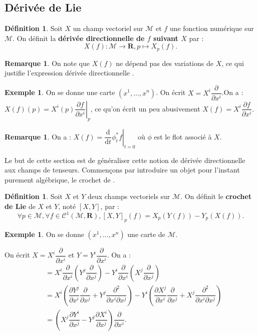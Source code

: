 \documentclass[12pt,a4paper]{article}
\theoremstyle{definition}
\newtheorem{defn}[thm]{Définition}
\newtheorem{ex}[thm]{Exemple}
\newtheorem{rqe}[thm]{Remarque}
\begin{document}
\subsection{Dérivée de Lie}
\begin{defn}
Soit $X$ un champ vectoriel sur $\mathcal{M}$ et $f$ une fonction numérique sur $\mathcal{M}$. On définit la \textbf{dérivée directionnelle de $f$ suivant $X$} par :
$$X(f):\mathcal{M}\to\mathbf{R}, p\mapsto X_p(f).$$
\end{defn}
\begin{rqe}
On note que $X(f)$ ne dépend pas des variations de $X$, ce qui justifie l'expression \og dérivée directionnelle \fg{} .
\end{rqe}
\begin{ex}
On se donne une carte $(x^1,\ldots,x^n)$. On écrit $X=X^i\dfrac{\partial}{\partial x^i}$.\newline On a : $X(f)(p)=X^i(p)\left.\dfrac{\partial f}{\partial x^i}\right|_p$, ce qu'on écrit un peu abusivement $X(f)=X^i\dfrac{\partial f}{\partial x^i}$.
\end{ex}
\begin{rqe}
On a : $X(f)=\left.\dfrac{\mathrm{d}}{\mathrm{d}t}\phi_t^*f\right|_{t=0}$ où $\phi$ est le flot associé à $X$.
\end{rqe}
Le but de cette section est de généraliser cette notion de dérivée directionnelle aux champs de tenseurs.
Commençons par introduire un objet pour l'instant purement algébrique, le crochet de .
\begin{defn}
Soit $X$ et $Y$ deux champs vectoriels sur $\mathcal{M}$.\newline
On définit le \textbf{crochet de Lie} de $X$ et $Y$, noté $[X,Y]$, par :
$$\forall p\in\mathcal{M},\forall f\in\mathcal{C}^1(\mathcal{M},\mathbf{R}), [X,Y]_p(f)=X_p(Y(f))-Y_p(X(f)).$$
\end{defn}
\begin{ex}
On se donne $(x^1,\ldots,x^n)$ une carte de $\mathcal{M}$.

On écrit $X=X^i\dfrac{\partial}{\partial x^i}$ et $Y=Y^i\dfrac{\partial}{\partial x^i}$. On a :
\begin{align*}
[X,Y]&=X^i\dfrac{\partial}{\partial x^i}\left(Y^j\dfrac{\partial}{\partial x^j}\right)-Y^i\dfrac{\partial}{\partial x^i}\left(X^j\dfrac{\partial}{\partial x^j}\right)\\&=X^i\left(\dfrac{\partial Y^j}{\partial x^i}\dfrac{\partial}{\partial x^j}+Y^j\dfrac{\partial ^2}{\partial x^i\partial x^j}\right)-Y^i\left(\dfrac{\partial X^j}{\partial x^i}\dfrac{\partial}{\partial x^j}+X^j\dfrac{\partial ^2}{\partial x^i\partial x^j}\right)\\&=\left(X^j\dfrac{\partial Y^i}{\partial x^j}-Y^j\dfrac{\partial X^i}{\partial x^j}\right)\dfrac{\partial}{\partial x^i}.
\end{align*}
\end{ex}
\end{document}
